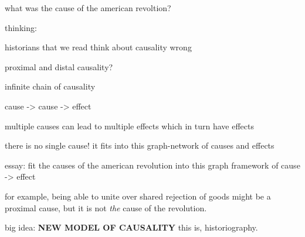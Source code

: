 \documentclass[letterpaper]{article}
\begin{document}
what was the cause of the american revoltion?

thinking:

historians that we read think about causality wrong

proximal and distal causality?

infinite chain of causality

cause -> cause -> effect

multiple causes can lead to multiple effects which in turn have effects

there is no single cause! it fits into this graph-network of causes and
effects

essay: fit the causes of the american revolution into this graph
framework of cause -> effect

for example, being able to unite over shared rejection of goods might be
a proximal cause, but it is not \emph{the} cause of the revolution.

big idea: \textbf{NEW MODEL OF CAUSALITY} this is, historiography.
\end{document}
